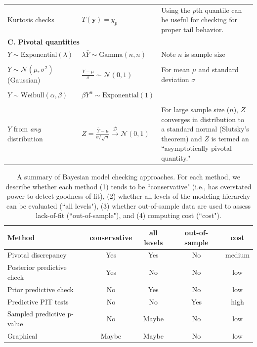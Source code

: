 \documentclass[12pt,english]{article}
\begin{document}
\begin{spacing}{1.9}
\begin{table}[htp]
\begin{tabular}{p{4cm}lp{5cm}}
        Kurtosis checks & $T(\textbf{y}) = y_{p} $ & Using the $p$th quantile can be useful for checking for proper tail behavior. \\
        \multicolumn{3}{l}{\textbf{C. Pivotal quantities}} \\
        $Y  \sim \textrm{Exponential}(\lambda)$ & $\lambda \bar{Y} \sim \textrm{Gamma}(n,n)$ & Note $n$ is sample size\\
        & & \\
        $Y \sim \mathcal{N}(\mu,\sigma^2)$ (Gaussian) & $ \frac{Y - \mu}{\sigma} \sim \mathcal{N}(0,1) $ & For mean $\mu$ and standard deviation $\sigma$  \\
        & & \\
        $Y \sim \textrm{Weibull}(\alpha,\beta)$ & $ \beta Y^\alpha \sim \textrm{Exponential}(1) $ & \\
        & & \\
        $Y$ from {\it any} distribution & $Z = \frac{\bar{Y}-\mu}{\sigma/\sqrt{n}} \xrightarrow[]{\mathcal{D}} \mathcal{N}(0,1)$ & For large sample size ($n$), $Z$ converges in distribution to a standard normal (Slutsky's theorem) and $Z$ is termed an ``asymptotically pivotal quantity." \\
        \hline
      \end{tabular}
    \end{table}


    \begin{table}[htp]
      \caption{A summary of Bayesian model checking approaches.  For each method, we describe whether each method (1) tends to be ``conservative" (i.e., has overstated power to detect goodness-of-fit), (2) whether all levels of the modeling hierarchy can be evaluated (``all levels"), (3) whether out-of-sample data are used to assess lack-of-fit (``out-of-sample"), and (4) computing cost (``cost").
      }
      \label{tab:checks}
      \centering
      \begin{tabular}{lcccc}
        \hline
        Method & conservative & all levels & out-of-sample  & cost\\
        \hline
        Pivotal discrepancy & Yes & Yes & No & medium \\
        Posterior predictive check & Yes & No & No & low \\
        Prior predictive check & No & Yes & No & low \\
        Predictive PIT tests &  No & No & Yes & high \\
        Sampled predictive p-value & No & Maybe & No & low \\
        Graphical & Maybe & Maybe &  No & low \\
        \hline
      \end{tabular}
    \end{table}


\end{spacing}
\end{document}
